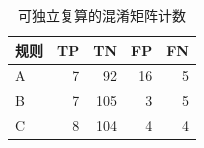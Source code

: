 \begin{table}[htbp]\centering
\caption{可独立复算的混淆矩阵计数}\label{tab:confusion}
\begin{tabular}{lrrrr}\toprule
规则 & TP & TN & FP & FN\\\midrule
A & 7 & 92 & 16 & 5\\
B & 7 & 105 & 3 & 5\\
C & 8 & 104 & 4 & 4\\
\bottomrule\end{tabular}\end{table}